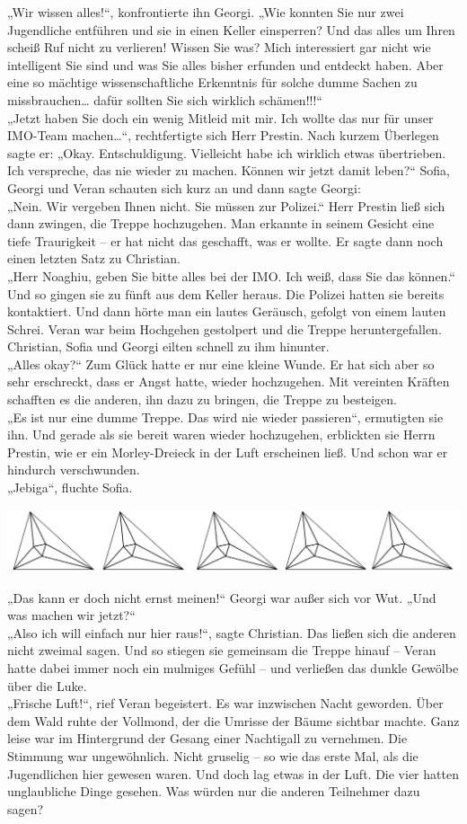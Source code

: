 \documentclass[oneside]{memoir}
\newcommand{\parasep}{
\bigskip
\bigskip
\begin{center} 
   \includegraphics[scale=.08]{parasep5.jpg} 
\end{center}
\bigskip
\bigskip
}
\begin{document}
„Wir wissen alles!“, konfrontierte ihn Georgi. „Wie konnten Sie nur zwei Jugendliche entführen und sie in einen Keller einsperren? Und das alles um Ihren scheiß Ruf nicht zu verlieren! Wissen Sie was? Mich interessiert gar nicht wie intelligent Sie sind und was Sie alles bisher erfunden und entdeckt haben. Aber eine so mächtige wissenschaftliche Erkenntnis für solche dumme Sachen zu missbrauchen\ldots{} dafür sollten Sie sich wirklich schämen!!!“ \\
„Jetzt haben Sie doch ein wenig Mitleid mit mir. Ich wollte das nur für unser IMO-Team machen\ldots“, rechtfertigte sich Herr Prestin. Nach kurzem Überlegen sagte er: „Okay. Entschuldigung. Vielleicht habe ich wirklich etwas übertrieben. Ich verspreche, das nie wieder zu machen. Können wir jetzt damit leben?“ 
Sofia, Georgi und Veran schauten sich kurz an und dann sagte Georgi: \\
„Nein. Wir vergeben Ihnen nicht. Sie müssen zur Polizei.“
Herr Prestin ließ sich dann zwingen, die Treppe hochzugehen. Man erkannte in seinem Gesicht eine tiefe Traurigkeit -- er hat nicht das geschafft, was er wollte. Er sagte dann noch einen letzten Satz zu Christian. \\
„Herr Noaghiu, geben Sie bitte alles bei der IMO. Ich weiß, dass Sie das können.“ \\
Und so gingen sie zu fünft aus dem Keller heraus. Die Polizei hatten sie bereits kontaktiert. 
Und dann hörte man ein lautes Geräusch, gefolgt von einem lauten Schrei. Veran war beim Hochgehen gestolpert und die Treppe heruntergefallen. Christian, Sofia und Georgi eilten schnell zu ihm hinunter. \\
„Alles okay?“ 
Zum Glück hatte er nur eine kleine Wunde. Er hat sich aber so sehr erschreckt, dass er Angst hatte, wieder hochzugehen. Mit vereinten Kräften schafften es die anderen, ihn dazu zu bringen, die Treppe zu besteigen. \\
„Es ist nur eine dumme Treppe. Das wird nie wieder passieren“, ermutigten sie ihn.
Und gerade als sie bereit waren wieder hochzugehen, erblickten sie Herrn Prestin, wie er ein Morley-Dreieck in der Luft erscheinen ließ. Und schon war er hindurch verschwunden.  \\
„Jebiga“, fluchte Sofia.

\parasep
     
„Das kann er doch nicht ernst meinen!“ Georgi war außer sich vor Wut. „Und was machen wir jetzt?“ \\
„Also ich will einfach nur hier raus!“, sagte Christian.
Das ließen sich die anderen nicht zweimal sagen. Und so stiegen sie gemeinsam die Treppe hinauf – Veran hatte dabei immer noch ein mulmiges Gefühl – und verließen das dunkle Gewölbe über die Luke. \\
„Frische Luft!“, rief Veran begeistert.
Es war inzwischen Nacht geworden. Über dem Wald ruhte der Vollmond, der die Umrisse der Bäume sichtbar machte. Ganz leise war im Hintergrund der Gesang einer Nachtigall zu vernehmen.
Die Stimmung war ungewöhnlich. Nicht gruselig – so wie das erste Mal, als die Jugendlichen hier gewesen waren. Und doch lag etwas in der Luft. Die vier hatten unglaubliche Dinge gesehen. Was würden nur die anderen Teilnehmer dazu sagen?
\end{document}
